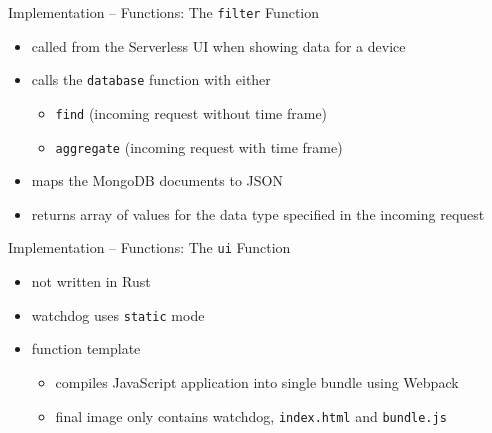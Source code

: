 \begin{frame}{Implementation -- Functions: The \texttt{filter} Function}
  \begin{itemize}
    \item called from the Serverless UI when showing data for a device
    \item calls the \texttt{database} function with either
      \begin{itemize}
        \item \texttt{find} (incoming request without time frame)
        \item \texttt{aggregate} (incoming request with time frame)
      \end{itemize}
    \item maps the MongoDB documents to JSON
    \item returns array of values for the data type specified in the incoming request
  \end{itemize}
\end{frame}

\begin{frame}{Implementation -- Functions: The \texttt{ui} Function}
  \begin{itemize}
    \item not written in Rust
    \item watchdog uses \texttt{static} mode
    \item function template
    \begin{itemize}
      \item compiles JavaScript application into single bundle using Webpack
      \item final image only contains watchdog, \texttt{index.html} and \texttt{bundle.js}
    \end{itemize}
  \end{itemize}
\end{frame}
